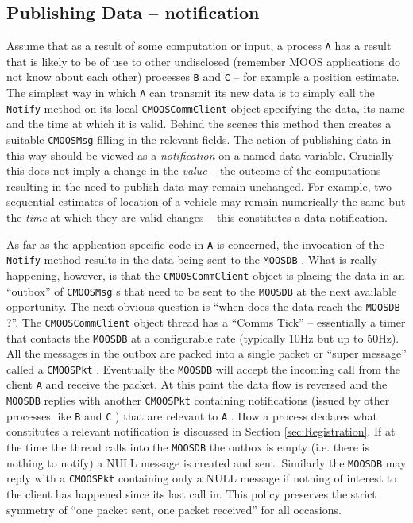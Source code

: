 \documentclass[a4paper,10pt]{article}
\newcommand{\Code}[1]{\texttt{#1} }
\newcommand{\code}[1]{\Code{#1} }
\newcommand{\DB}   {\code{{MOOSDB}}}
\begin{document}
\subsection{Publishing Data -- notification} Assume that as a result of
 some computation or input, a process \code{A} has a result that
is likely to be of use to other undisclosed (remember MOOS
applications do not know about each other) processes \code{B} and
\code{C} -- for example a position estimate. The simplest way in
which \code{A} can transmit its new data is to simply call the
\code{Notify} method on its local \code{CMOOSCommClient} object
specifying the data, its name and the time at which it is valid.
Behind the scenes this method then creates a suitable
\code{CMOOSMsg} filling in the relevant fields. The action of
publishing data in this way should be viewed as a
{\emph{notification}} on a named data variable. Crucially this
does not imply a change in the {\emph{value}} -- the outcome of the
computations resulting in the need to publish data may remain unchanged.
For example, two sequential estimates of location of a
vehicle may remain numerically the same but the {\it{time}} at
which they are valid changes -- this constitutes a data
notification.

As far as the application-specific code in \code{A} is concerned,
the invocation of the \code{Notify} method results in the data
being sent to the \DB. What is really happening, however, is that
the \code{CMOOSCommClient} object is placing the data in an
``outbox''  of \code{CMOOSMsg}s that need to be sent to the \DB at
the next available opportunity. The next obvious question is
``when does the  data reach the \DB?''. The \code{CMOOSCommClient}
object thread has a ``Comms Tick'' -- essentially a timer that
contacts the \DB at a configurable rate (typically 10Hz but up to
50Hz). All the messages in the outbox are packed into a single
packet or ``super message'' called a \code{CMOOSPkt}. Eventually
the \DB will accept the incoming call from the client \code{A} and
receive the packet. At this point the data flow is reversed and
the \DB replies with another \code{CMOOSPkt} containing
notifications (issued by other processes like \code{B} and
\code{C}) that are relevant to  \code{A}. How a process declares
what constitutes a relevant notification is discussed in Section
\ref{sec:Registration}. If at the time the thread calls into the
\DB the outbox is empty (i.e. there is nothing to notify) a NULL
message is created and sent. Similarly the \DB may reply with a
\code{CMOOSPkt} containing only a NULL message if nothing of
interest to the client has happened since its last call in. This
policy preserves the strict symmetry of ``one packet sent, one
packet received'' for all occasions.
\end{document}
